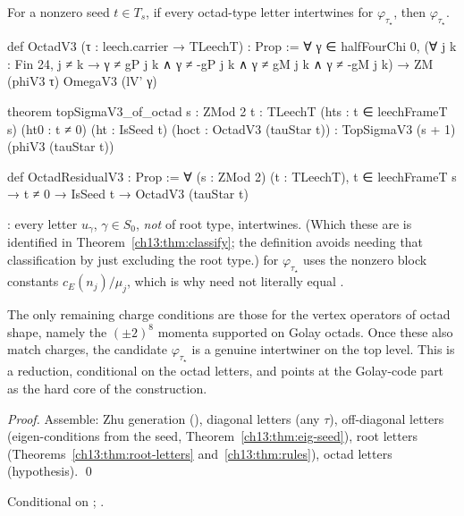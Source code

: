 \begin{theorem}\label{ch13:thm:octad-red}
For a nonzero seed $t\in T_s$, if every octad-type letter intertwines for $\varphi_{\tau_\star}$, then
 $\varphi_{\tau_\star}$.
\end{theorem}
\begin{leancode}
def OctadV3 (τ : leech.carrier → TLeechT) : Prop :=
  ∀ γ ∈ halfFourChi 0, (∀ j k : Fin 24, j ≠ k → γ ≠ gP j k ∧ γ ≠ -gP j k ∧ γ ≠ gM j k ∧ γ ≠ -gM j k) →
    ZM (phiV3 τ) OmegaV3 (lV' γ)

theorem topSigmaV3_of_octad {s : ZMod 2} {t : TLeechT} (hts : t ∈ leechFrameT s) (ht0 : t ≠ 0)
    (ht : IsSeed t) (hoct : OctadV3 (tauStar t)) :
    TopSigmaV3 (s + 1) (phiV3 (tauStar t))

def OctadResidualV3 : Prop :=
  ∀ (s : ZMod 2) (t : TLeechT), t ∈ leechFrameT s → t ≠ 0 → IsSeed t → OctadV3 (tauStar t)
\end{leancode}
\begin{dictionary}
: every letter $u_\gamma$, $\gamma\in S_0$, \emph{not} of root type, intertwines. (Which these are is
identified in Theorem~\ref{ch13:thm:classify}; the definition avoids needing that classification by just
excluding the root type.)  for $\varphi_{\tau_\star}$ uses the nonzero block constants
$c_E(n_j)/\mu_j$, which is why  need not literally equal .
\end{dictionary}
\begin{physics}
The only remaining charge conditions are those for the vertex operators of octad shape, namely the $(\pm2)^8$ momenta supported on Golay octads. Once these also match charges, the candidate $\varphi_{\tau_\star}$ is a genuine intertwiner on the top level. This is a reduction, conditional on the octad letters, and points at the Golay-code part as the hard core of the construction.
\end{physics}
\noindent\emph{Proof.} Assemble: Zhu generation (), diagonal letters (any $\tau$),
off-diagonal letters (eigen-conditions from the seed, Theorem~\ref{ch13:thm:eig-seed}), root letters
(Theorems~\ref{ch13:thm:root-letters} and~\ref{ch13:thm:rules}), octad letters (hypothesis). \qed
\begin{status}Conditional on ; .\end{status}

